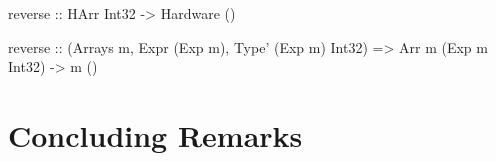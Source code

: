 \lipsum[4]

\begin{stub}
reverse :: HArr Int32 -> Hardware ()
\end{stub}

\lipsum[5]

\begin{stub}
reverse :: (Arrays m, Expr (Exp m), Type' (Exp m) Int32) =>
  Arr m (Exp m Int32) -> m ()
\end{stub}

\lipsum[6]

%
%

\chapter{Concluding Remarks}
\label{ch:conc}

\lipsum
